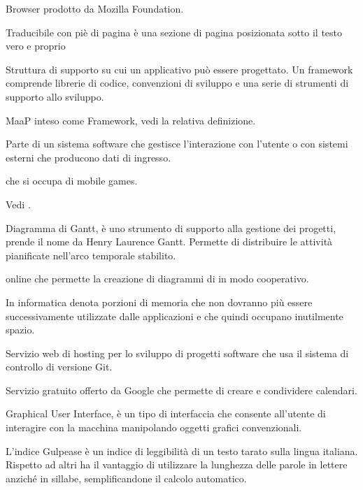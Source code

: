 Browser  prodotto da Mozilla Foundation.

Traducibile con piè di pagina è una sezione di pagina posizionata sotto il testo vero e proprio

Struttura di supporto su cui un applicativo può essere progettato.
Un framework comprende librerie di codice, convenzioni di sviluppo e una serie di strumenti di supporto allo sviluppo.

MaaP inteso come Framework, vedi la relativa definizione.

Parte di un sistema software che gestisce l'interazione con l'utente o con sistemi esterni che producono dati di ingresso.

 che si occupa di mobile games.

Vedi .


Diagramma di Gantt, è uno strumento di supporto alla gestione dei progetti, prende il nome da Henry Laurence Gantt.
Permette di distribuire le attività pianificate nell'arco temporale stabilito.

 online che permette la creazione di diagrammi di  in modo cooperativo.

In informatica denota porzioni di memoria che non dovranno più essere successivamente utilizzate dalle applicazioni e che quindi occupano inutilmente spazio.

Servizio web di hosting per lo sviluppo di progetti software che usa il sistema di controllo di versione Git.

Servizio gratuito offerto da Google che permette di creare e condividere calendari.

Graphical User Interface, è un tipo di interfaccia che consente all'utente di interagire con la macchina manipolando oggetti grafici convenzionali.

L'indice Gulpease è un indice di leggibilità di un testo tarato sulla lingua italiana. Rispetto ad altri ha il vantaggio di utilizzare la lunghezza delle parole in lettere anziché in sillabe, semplificandone il calcolo automatico.

